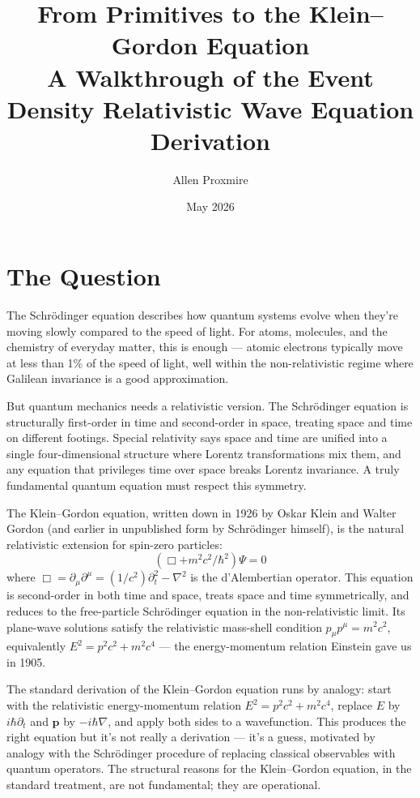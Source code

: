 \documentclass[11pt,a4paper]{article}
\title{\vspace{-1cm}\Large\bfseries From Primitives to the Klein--Gordon Equation\\[6pt]
\large\mdseries A Walkthrough of the Event Density Relativistic Wave Equation Derivation}
\author{Allen Proxmire}
\date{May 2026}
\begin{document}
\maketitle
\thispagestyle{empty}

\section{The Question}

The Schr\"odinger equation describes how quantum systems evolve when they're moving slowly compared to the speed of light. For atoms, molecules, and the chemistry of everyday matter, this is enough --- atomic electrons typically move at less than 1\% of the speed of light, well within the non-relativistic regime where Galilean invariance is a good approximation.

But quantum mechanics needs a relativistic version. The Schr\"odinger equation is structurally first-order in time and second-order in space, treating space and time on different footings. Special relativity says space and time are unified into a single four-dimensional structure where Lorentz transformations mix them, and any equation that privileges time over space breaks Lorentz invariance. A truly fundamental quantum equation must respect this symmetry.

The Klein--Gordon equation, written down in 1926 by Oskar Klein and Walter Gordon (and earlier in unpublished form by Schr\"odinger himself), is the natural relativistic extension for spin-zero particles:
\[
(\Box + m^{2}c^{2}/\hbar^{2})\Psi = 0
\]
where $\Box = \partial_\mu\partial^\mu = (1/c^2)\partial_t^2 - \nabla^2$ is the d'Alembertian operator. This equation is second-order in both time and space, treats space and time symmetrically, and reduces to the free-particle Schr\"odinger equation in the non-relativistic limit. Its plane-wave solutions satisfy the relativistic mass-shell condition $p_\mu p^\mu = m^2c^2$, equivalently $E^2 = p^2c^2 + m^2c^4$ --- the energy-momentum relation Einstein gave us in 1905.

The standard derivation of the Klein--Gordon equation runs by analogy: start with the relativistic energy-momentum relation $E^2 = p^2c^2 + m^2c^4$, replace $E$ by $i\hbar\partial_t$ and $\mathbf{p}$ by $-i\hbar\nabla$, and apply both sides to a wavefunction. This produces the right equation but it's not really a derivation --- it's a guess, motivated by analogy with the Schr\"odinger procedure of replacing classical observables with quantum operators. The structural reasons for the Klein--Gordon equation, in the standard treatment, are not fundamental; they are operational.
\end{document}
